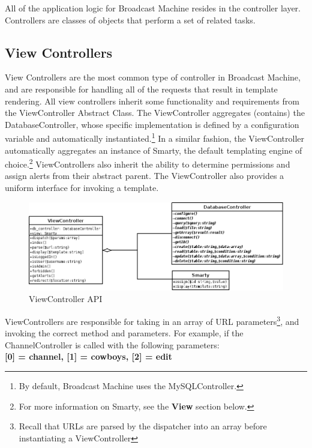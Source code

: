 \documentclass[a4paper,12pt]{report}
\begin{document}
All of the application logic for Broadcast Machine resides in the controller layer. Controllers are classes of objects that perform a set of related tasks. 

\subsection*{View Controllers}
View Controllers are the most common type of controller in Broadcast Machine, and are responsible for handling all of the requests that result in template rendering. All view controllers inherit some functionality and requirements from the ViewController Abstract Class. The ViewController aggregates (contains) the DatabaseController, whose specific implementation is defined by a configuration variable and automatically instantiated.\footnote{By default, Broadcast Machine uses the MySQLController.} In a similar fashion, the ViewController automatically aggregates an instance of Smarty, the default templating engine of choice.\footnote{For more information on Smarty, see the \textbf{View} section below.} ViewControllers also inherit the ability to determine permissions and assign alerts from their abstract parent. The ViewController also provides a uniform interface for invoking a template.

\begin{figure}[h]
\begin{center}
\includegraphics[scale=0.5]{./images/controllers.png}
\end{center}
\caption{ViewController API}
\end{figure}

ViewControllers are responsible for taking in an array of URL parameters\footnote{Recall that URLs are parsed by the dispatcher into an array before instantiating a ViewController}, and invoking the correct method and parameters. For example, if the ChannelController is called with the following parameters: \\

\textbf{[0] = channel, [1] = cowboys, [2] = edit} \\
\end{document}
